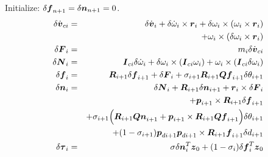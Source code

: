 \begin{itemize}
Initialize: $\delta \mbox{\boldmath $ f $}_{n+1} = \delta \mbox{\boldmath $ n $}_{n+1} = 0$.
\begin{eqnarray}
\delta \dot{\mbox{\boldmath $ v $}}_{ci} & = & \delta \dot{\mbox{\boldmath $ v $}}_i + \delta \dot{\omega}_i\times
\mbox{\boldmath $ r $}_i + \delta \omega_i \times(\omega_i \times \mbox{\boldmath $ r $}_i) \\ \nonumber
& & + \omega_i \times ( \delta \omega_i \times \mbox{\boldmath $ r $}_i) \\
\delta \mbox{\boldmath $ F $}_i & = & m_i \delta \dot{\mbox{\boldmath $ v $}}_{ci} \\
\delta \mbox{\boldmath $ N $}_i & = & \mbox{\boldmath $ I $}_{ci} \delta \dot{\omega}_i + \delta
\omega_i \times (\mbox{\boldmath $ I $}_{ci}\omega_i) + \omega_i \times
(\mbox{\boldmath $ I $}_{ci} \delta \omega_i) \\
\delta \mbox{\boldmath $ f $}_i & = & \mbox{\boldmath $ R $}_{i+1} \delta \mbox{\boldmath $ f $}_{i+1} +
\delta \mbox{\boldmath $ F $}_i + \sigma_{i+1} \mbox{\boldmath $ R $}_{i+1} \mbox{\boldmath $ Qf $}_{i+1} \delta \theta_{i+1} \\
\delta \mbox{\boldmath $ n $}_i & = & \delta \mbox{\boldmath $ N $}_i + \mbox{\boldmath $ R $}_{i+1} \delta
\mbox{\boldmath $ n $}_{i+1} + \mbox{\boldmath $ r $}_i\times \delta \mbox{\boldmath $ F $}_i \\ \nonumber
& & + \mbox{\boldmath $ p $}_{i+1} \times \mbox{\boldmath $ R $}_{i+1} \delta \mbox{\boldmath $ f $}_{i+1} \\ \nonumber  
& & + \sigma_{i+1} \Big( \mbox{\boldmath $ R $}_{i+1} \mbox{\boldmath $ Qn $}_{i+1}
+ \mbox{\boldmath $ p $}_{i+1} \times \mbox{\boldmath $ R $}_{i+1} \mbox{\boldmath $ Qf $}_{i+1} \Big) \delta
\theta_{i+1} \\ \nonumber
& & + (1-\sigma_{i+1} ) \mbox{\boldmath $ p $}_{di+1} \mbox{\boldmath $ p $}_{di+1} \times \mbox{\boldmath $ R $}_{i+1}
\mbox{\boldmath $ f $}_{i+1} \delta d_{i+1}  \\
\delta \mbox{\boldmath $ \tau $}_i & = & \sigma \delta\mbox{\boldmath $ n $}_i^T \mbox{\boldmath $ z $}_0 +
(1 - \sigma_i) \delta\mbox{\boldmath $ f $}_i^T \mbox{\boldmath $ z $}_0
\end{eqnarray}
\end{itemize}













